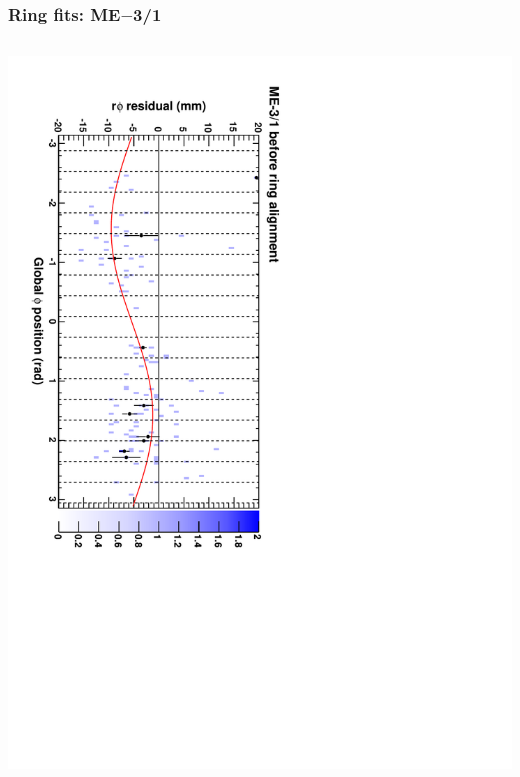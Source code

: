 \documentclass[compress]{beamer}
\begin{document}
\begin{frame}
\frametitle{Ring fits: ME$-$3/1}
\vfill
\begin{columns}
\includegraphics[height=\linewidth, angle=90]{ringfits_before/mem31.pdf}


\end{columns}
\end{frame}
\end{document}
